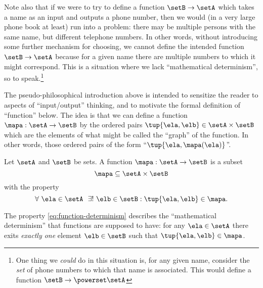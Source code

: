 Note also that if we were to try to define a function $\setB \to \setA$ which takes a name as an input and outputs a phone number, then we would (in a very large phone book at least) run into a problem: there may be multiple persons with the same name, but different telephone numbers. In other words, without introducing some further mechanism for choosing, we cannot define the intended function $\setB \to \setA$ because for a given name there are multiple numbers to which it might correspond. This is a situation where we lack ``mathematical determinism'', so to speak.\footnote{One thing we \emph{could} do in this situation is, for any given name, consider the \emph{set} of phone numbers to which that name is associated. This would define a function $\setB \to \powerset \setA$}

The pseudo-philosophical introduction above is intended to sensitize the reader to aspects of ``input/output'' thinking, and to motivate the formal definition of ``function'' below. The idea is that we can define a function $\mapa: \setA \to \setB$ by the ordered pairs $\tup{\ela, \elb} \in \setA \times \setB$ which are the elements of what might be called the ``graph'' of the function. In other words, those ordered pairs of the form ``$\tup{\ela, \mapa(\ela)}$''.

\begin{definition}
Let $\setA$ and $\setB$ be sets. A function $\mapa: \setA \to \setB$ is a subset
\begin{equation}
\mapa \subseteq \setA \times \setB
\end{equation}
with the property 
\begin{equation}\label{eq:function-determinism}
\forall \ \ela \in \setA  \ \  \exists ! \ \elb \in \setB : \tup{\ela,\elb} \in \mapa.
\end{equation}
\end{definition}

The property \cref{eq:function-determinism} describes the ``mathematical determinism'' that functions are supposed to have: for any $\ela \in \setA$ there exits \emph{exactly one} element $\elb \in \setB$ such that $\tup{\ela, \elb} \in \mapa$. 

\clearpage
